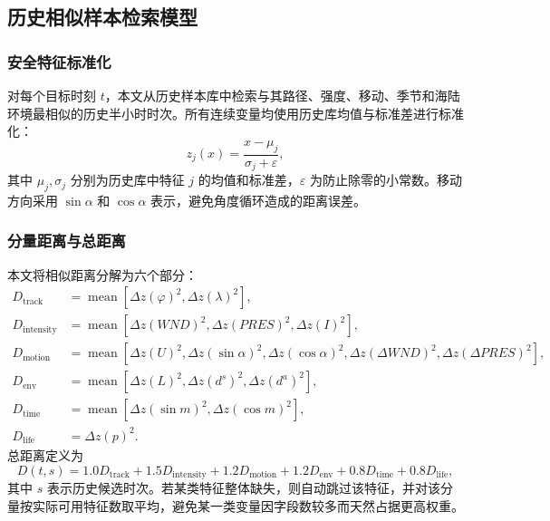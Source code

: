 \documentclass[UTF8,a4paper,zihao=5,fontset=fandol]{ctexart}
\numberwithin{equation}{section}
\numberwithin{figure}{section}
\numberwithin{table}{section}
\begin{document}
\subsection{历史相似样本检索模型}

\subsubsection{安全特征标准化}

对每个目标时刻 $t$，本文从历史样本库中检索与其路径、强度、移动、季节和海陆环境最相似的历史半小时时次。所有连续变量均使用历史库均值与标准差进行标准化：
\begin{equation}
z_j(x)=\frac{x-\mu_j}{\sigma_j+\varepsilon},
\end{equation}
其中 $\mu_j,\sigma_j$ 分别为历史库中特征 $j$ 的均值和标准差，$\varepsilon$ 为防止除零的小常数。移动方向采用 $\sin \alpha$ 和 $\cos \alpha$ 表示，避免角度循环造成的距离误差。

\subsubsection{分量距离与总距离}

本文将相似距离分解为六个部分：
\begin{align}
D_{\mathrm{track}} &= \operatorname{mean}\left[
\Delta z(\varphi)^2,\Delta z(\lambda)^2
\right],\\
D_{\mathrm{intensity}} &= \operatorname{mean}\left[
\Delta z(WND)^2,\Delta z(PRES)^2,\Delta z(I)^2
\right],\\
D_{\mathrm{motion}} &= \operatorname{mean}\left[
\Delta z(U)^2,\Delta z(\sin\alpha)^2,\Delta z(\cos\alpha)^2,
\Delta z(\Delta WND)^2,\Delta z(\Delta PRES)^2
\right],\\
D_{\mathrm{env}} &= \operatorname{mean}\left[
\Delta z(L)^2,\Delta z(d^s)^2,\Delta z(d^a)^2
\right],\\
D_{\mathrm{time}} &= \operatorname{mean}\left[
\Delta z(\sin m)^2,\Delta z(\cos m)^2
\right],\\
D_{\mathrm{life}} &= \Delta z(p)^2.
\end{align}
总距离定义为
\begin{equation}
D(t,s)=
1.0D_{\mathrm{track}}
+1.5D_{\mathrm{intensity}}
+1.2D_{\mathrm{motion}}
+1.2D_{\mathrm{env}}
+0.8D_{\mathrm{time}}
+0.8D_{\mathrm{life}},
\end{equation}
其中 $s$ 表示历史候选时次。若某类特征整体缺失，则自动跳过该特征，并对该分量按实际可用特征数取平均，避免某一类变量因字段数较多而天然占据更高权重。
\end{document}
